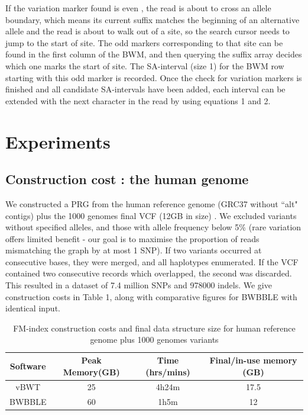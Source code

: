\documentclass[runningheads,a4paper]{llncs}
\begin{document}
If the variation marker found is  even , the read is about to cross an allele boundary, which means its current suffix matches the beginning of an alternative allele and the read is about to walk out of a site, so the search cursor needs to jump to the start of site. The odd markers corresponding to that site can be found in the first column of the BWM, and then querying the suffix array decides which one marks the start of site. The SA-interval (size 1) for the BWM row starting with this odd marker is recorded.
Once the check for variation markers is finished and all candidate SA-intervals have been added, each interval can be extended with the next character in the read by using equations 1 and 2. 





\section{Experiments}
\subsection{Construction cost : the human genome}
We constructed a PRG from the human reference genome (GRC37 without ``alt" contigs) plus the 1000 genomes final VCF (12GB in size) \cite{1000g}. We excluded  variants without  specified alleles, and those with allele frequency below 5\% (rare variation offers limited benefit - our goal is to maximise the proportion of reads mismatching the graph by at most 1 SNP). If two variants occurred at consecutive bases, they were merged, and all haplotypes enumerated. If the VCF contained two consecutive records which overlapped, the second was discarded. This resulted in a dataset of 7.4 million SNPs and 978000 indels. We give construction costs in Table 1, along with comparative figures for BWBBLE with identical input. 
 
\begin{table}
\caption{FM-index construction costs and final data structure size for human reference genome plus 1000 genomes variants}
\centering
\begin{tabular}{c c c c}
\hline
Software  & Peak Memory(GB) & Time (hrs/mins) & Final/in-use memory (GB)\\
\hline
vBWT  & 25  & 4h24m & 17.5 \\
BWBBLE  & 60 &  1h5m  & 12\\ 
\hline
\end{tabular}
\end{table}
\end{document}
